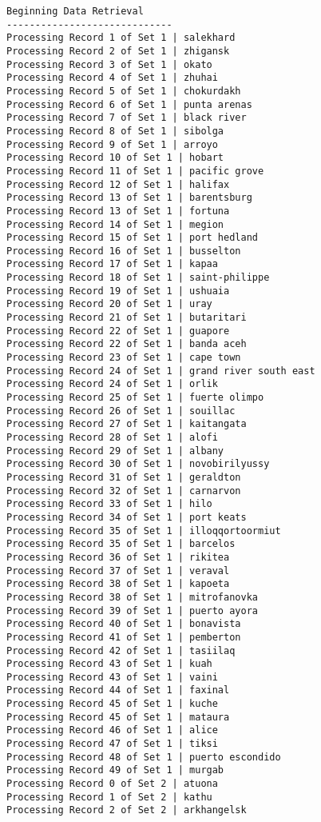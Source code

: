 \documentclass[11pt]{article}
\begin{document}
    \begin{Verbatim}[commandchars=\\\{\}]
Beginning Data Retrieval
-----------------------------
Processing Record 1 of Set 1 | salekhard
Processing Record 2 of Set 1 | zhigansk
Processing Record 3 of Set 1 | okato
Processing Record 4 of Set 1 | zhuhai
Processing Record 5 of Set 1 | chokurdakh
Processing Record 6 of Set 1 | punta arenas
Processing Record 7 of Set 1 | black river
Processing Record 8 of Set 1 | sibolga
Processing Record 9 of Set 1 | arroyo
Processing Record 10 of Set 1 | hobart
Processing Record 11 of Set 1 | pacific grove
Processing Record 12 of Set 1 | halifax
Processing Record 13 of Set 1 | barentsburg
Processing Record 13 of Set 1 | fortuna
Processing Record 14 of Set 1 | megion
Processing Record 15 of Set 1 | port hedland
Processing Record 16 of Set 1 | busselton
Processing Record 17 of Set 1 | kapaa
Processing Record 18 of Set 1 | saint-philippe
Processing Record 19 of Set 1 | ushuaia
Processing Record 20 of Set 1 | uray
Processing Record 21 of Set 1 | butaritari
Processing Record 22 of Set 1 | guapore
Processing Record 22 of Set 1 | banda aceh
Processing Record 23 of Set 1 | cape town
Processing Record 24 of Set 1 | grand river south east
Processing Record 24 of Set 1 | orlik
Processing Record 25 of Set 1 | fuerte olimpo
Processing Record 26 of Set 1 | souillac
Processing Record 27 of Set 1 | kaitangata
Processing Record 28 of Set 1 | alofi
Processing Record 29 of Set 1 | albany
Processing Record 30 of Set 1 | novobirilyussy
Processing Record 31 of Set 1 | geraldton
Processing Record 32 of Set 1 | carnarvon
Processing Record 33 of Set 1 | hilo
Processing Record 34 of Set 1 | port keats
Processing Record 35 of Set 1 | illoqqortoormiut
Processing Record 35 of Set 1 | barcelos
Processing Record 36 of Set 1 | rikitea
Processing Record 37 of Set 1 | veraval
Processing Record 38 of Set 1 | kapoeta
Processing Record 38 of Set 1 | mitrofanovka
Processing Record 39 of Set 1 | puerto ayora
Processing Record 40 of Set 1 | bonavista
Processing Record 41 of Set 1 | pemberton
Processing Record 42 of Set 1 | tasiilaq
Processing Record 43 of Set 1 | kuah
Processing Record 43 of Set 1 | vaini
Processing Record 44 of Set 1 | faxinal
Processing Record 45 of Set 1 | kuche
Processing Record 45 of Set 1 | mataura
Processing Record 46 of Set 1 | alice
Processing Record 47 of Set 1 | tiksi
Processing Record 48 of Set 1 | puerto escondido
Processing Record 49 of Set 1 | murgab
Processing Record 0 of Set 2 | atuona
Processing Record 1 of Set 2 | kathu
Processing Record 2 of Set 2 | arkhangelsk

\end{Verbatim}
\end{document}
